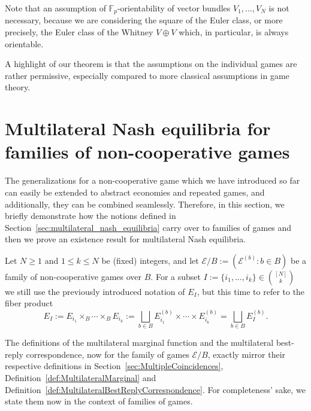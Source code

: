 \documentclass[a4paper,11pt,reqno,english]{amsart}
\theoremstyle{plain}
\theoremstyle{definition}
\newcommand{\Ecal}{\mathcal{E}}
\begin{document}
\medskip
Note that an assumption of $\mathbb{F}_p$-orientability of vector bundles $V_1,\dots,V_N$ is not necessary, because we are considering the square of the Euler class, or more precisely, the Euler class of the Whitney $V\oplus V$ which, in particular, is always orientable.

\medskip
A highlight of our theorem is that the assumptions on the individual games are rather permissive, especially compared to more classical assumptions in game theory.



\section{Multilateral Nash equilibria for families of non-cooperative games}\label{sec:multilateral_nash_equilibria_family}

The generalizations for a non-cooperative game which we have introduced so far can easily be extended to abstract economies and repeated games, and additionally, they can be combined seamlessly.
Therefore, in this section, we briefly demonstrate how the notions defined in Section~\ref{sec:multilateral_nash_equilibria} carry over to families of games and then we prove an existence result for multilateral Nash equilibria.

\medskip
Let $N \geq 1$ and $1\leq k\leq N$ be (fixed) integers, and let $\Ecal/B:=(\Ecal^{(b)}:b\in B)$ be a family of non-cooperative games over $B$.
For a subset $I := \{i_1,\dots,i_k\}\in\binom{[N]}{k}$ we still use the previously introduced notation of $E_I$, but this time to refer to the fiber product
\begin{displaymath}
	E_I := E_{i_1}\times_B \cdots \times_B E_{i_k} :=  \bigsqcup_{b\in B} E_{i_1}^{(b)} \times\cdots\times E_{i_k}^{(b)} = \bigsqcup_{b\in B} E_I^{(b)}.
\end{displaymath}

\medskip
The definitions of the multilateral marginal function and the multilateral best-reply correspondence, now for the family of games $\Ecal/B$, exactly mirror their respective definitions in Section~\ref{sec:MultipleCoincidences}, Definition~\ref{def:MultilateralMarginal} and Definition~\ref{def:MultilateralBestReplyCorrespondence}.
For completeness' sake, we state them now in the context of families of games.
\end{document}
